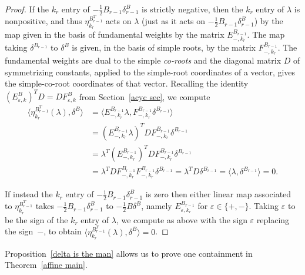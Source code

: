 \documentclass{amsart}
\theoremstyle{definition}
\theoremstyle{remark}
\numberwithin{equation}{section}
\newcommand{\ep}{\varepsilon}
\newcommand{\set}[1]{{\lbrace #1 \rbrace}}
\newcommand{\br}[1]{{\langle #1 \rangle}}
\newcommand{\0}{{\mathbf{0}}}
\newcommand{\symmetrizer}{{D}}
\begin{document}
\begin{proof}
If the $k_r$ entry of $-\frac12B_{r-1}\delta^B_{r-1}$ is strictly negative, then the $k_r$ entry of $\lambda$ is nonpositive, and thus $\eta^{B^T_{r-1}}_{k_r}$ acts on $\lambda$ (just as it acts on $-\frac12B_{r-1}\delta^B_{r-1}$) by the map given in the basis of fundamental weights by the matrix $E_{-,k_r}^{B_{r-1}}$.
The map taking $\delta^{B_{r-1}}$ to $\delta^B$ is given, in the basis of simple roots, by the matrix $F_{-,k_r}^{B_{r-1}}$.
The fundamental weights are dual to the simple \emph{co-roots} and the diagonal matrix $\symmetrizer$ of symmetrizing constants, applied to the simple-root coordinates of a vector, gives the simple-co-root coordinates of that vector.
Recalling the identity $(E_{\ep,k}^B)^T\symmetrizer=\symmetrizer F_{\ep,k}^B$ from Section~\ref{acyc sec}, we compute
\begin{align*}
\br{\eta^{B^T_{r-1}}_{k_r}(\lambda),\delta^B}
&=\br{E_{-,k_r}^{B_{r-1}}\lambda,F_{-,k_r}^{B_{r-1}}\delta^{B_{r-1}}}\\
&=(E_{-,k_r}^{B_{r-1}}\lambda)^T\symmetrizer F_{-,k_r}^{B_{r-1}}\delta^{B_{r-1}}\\
&=\lambda^T(E_{-,k_r}^{B_{r-1}})^T\symmetrizer F_{-,k_r}^{B_{r-1}}\delta^{B_{r-1}}\\
&=\lambda^T\symmetrizer F_{-,k_r}^{B_{r-1}}F_{-,k_r}^{B_{r-1}}\delta^{B_{r-1}}=\lambda^T\symmetrizer\delta^{B_{r-1}}=\br{\lambda,\delta^{B_{r-1}}}=0.
\end{align*}

If instead the $k_r$ entry of $-\frac12B_{r-1}\delta^B_{r-1}$ is zero then either linear map associated to $\eta^{B^T_{r-1}}_{k_r}$ takes $-\frac12B_{r-1}\delta^B_{r-1}$ to $-\frac12B\delta^B$, namely $E_{\ep,k_r}^{B_{r-1}}$ for $\ep\in\set{+,-}$.
Taking $\ep$ to be the sign of the $k_r$ entry of $\lambda$, we compute as above with the sign $\ep$ replacing the sign~$-$, to obtain $\br{\eta^{B^T_{r-1}}_{k_r}(\lambda),\delta^B}=0$.
\end{proof}

Proposition~\ref{delta is the man} allows us to prove one containment in Theorem~\ref{affine main}.
\end{document}
